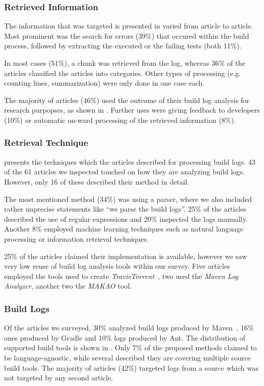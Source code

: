 \subsubsection{Retrieved Information}
The information that was targeted is presented in
 varied from article to article.
Most prominent was the search for errors (39\%) that occured within
the build process, followed by extracting the executed or the failing
tests
(both 11\%).

In most cases (51\%), a chunk was retrieved from the log, whereas 36\%
of the articles classified the articles into categories.
Other types of processing (e.g.
counting lines, summarization) were only
done in one case each.

The majority of articles (46\%) used the outcome of their build log
analysis
for research purpopses, as shown in .
Further uses were giving feedback to developers (10\%) or automatic
on-ward
processing of the retrieved information (8\%).

\subsubsection{Retrieval Technique}
 presents the techniques which the articles
described for processing build logs.
43 of the 61 articles we inspected touched on how they are analyzing build
logs.
However, only 16 of these described their method in detail.

The most mentioned method (34\%) was using a parser, where we also
included
rather unprecise statements like ``we parse the build logs''.
25\% of the articles described the use of regular expressions and 20\%
inspected the logs manually.
Another 8\% employed machine learning techniques such as natural language
processing or information retrieval techniques.

25\% of the articles claimed their implementation is available, however we
saw very low reuse of build log analysis tools within our survey.
Five articles employed the tools used to create
\emph{TravisTorrent}~\cite{beller2017travistorrent}, two used the
\emph{Maven Log Analyzer}, %
another two the \emph{MAKAO} tool.

\subsubsection{Build Logs}
Of the articles we surveyed, 30\% analyzed build logs produced by
Maven~\cite{maven2019website}, 16\% ones produced by Gradle %
and 10\% logs produced by Ant.
The distribution of supported build tools is shown in
.
Only 7\% of the proposed methods claimed to be language-agnostic, while
several described they are covering multiple source build tools.
The majority of articles (42\%) targeted logs from a source which was not
targeted by any second article.


